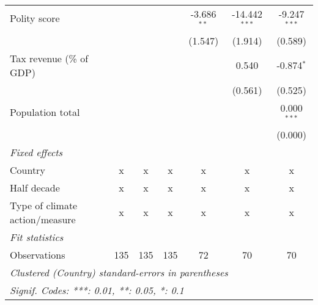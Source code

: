 \begin{tabular}{lcccccc}
   Polity score                                         &                &               &               & -3.686$^{**}$  & -14.442$^{***}$ & -9.247$^{***}$\\   
                                                        &                &               &               & (1.547)        & (1.914)         & (0.589)\\   
   Tax revenue (\% of GDP)                              &                &               &               &                & 0.540           & -0.874$^{*}$\\   
                                                        &                &               &               &                & (0.561)         & (0.525)\\   
   Population total                                     &                &               &               &                &                 & 0.000$^{***}$\\   
                                                        &                &               &               &                &                 & (0.000)\\   
   \emph{Fixed effects}\\
   Country                                              & x              & x             & x             & x              & x               & x\\  
   Half decade                                          & x              & x             & x             & x              & x               & x\\  
   Type of climate action/measure                       & x              & x             & x             & x              & x               & x\\  
   \midrule \emph{Fit statistics}\\
   Observations                                         & 135            & 135           & 135           & 72             & 70              & 70\\  
   \midrule
   \multicolumn{7}{l}{\emph{Clustered (Country) standard-errors in parentheses}}\\
   \multicolumn{7}{l}{\emph{Signif. Codes: ***: 0.01, **: 0.05, *: 0.1}}\\
\end{tabular}
\par\endgroup


